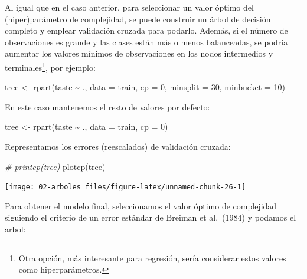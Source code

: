 \documentclass[
]{book}
\newenvironment{Shaded}{\begin{snugshade}}{\end{snugshade}}
\newcommand{\AttributeTok}[1]{\textcolor[rgb]{0.77,0.63,0.00}{#1}}
\newcommand{\CommentTok}[1]{\textcolor[rgb]{0.56,0.35,0.01}{\textit{#1}}}
\newcommand{\DecValTok}[1]{\textcolor[rgb]{0.00,0.00,0.81}{#1}}
\newcommand{\FunctionTok}[1]{\textcolor[rgb]{0.00,0.00,0.00}{#1}}
\newcommand{\NormalTok}[1]{#1}
\newcommand{\OtherTok}[1]{\textcolor[rgb]{0.56,0.35,0.01}{#1}}
\newcommand{\SpecialCharTok}[1]{\textcolor[rgb]{0.00,0.00,0.00}{#1}}
\theoremstyle{break}
\theoremstyle{definition}
\theoremstyle{definition}
\theoremstyle{definition}
\theoremstyle{definition}
\theoremstyle{remark}
\begin{document}
Al igual que en el caso anterior, para seleccionar un valor óptimo del (hiper)parámetro de complejidad, se puede construir un árbol de decisión completo y emplear validación cruzada para podarlo.
Además, si el número de observaciones es grande y las clases están más o menos balanceadas,
se podría aumentar los valores mínimos de observaciones en los nodos intermedios y terminales\footnote{Otra opción, más interesante para regresión, sería considerar estos valores como hiperparámetros.}, por ejemplo:

\begin{Shaded}
\begin{Highlighting}[]
\NormalTok{tree }\OtherTok{\textless{}{-}} \FunctionTok{rpart}\NormalTok{(taste }\SpecialCharTok{\textasciitilde{}}\NormalTok{ ., }\AttributeTok{data =}\NormalTok{ train, }\AttributeTok{cp =} \DecValTok{0}\NormalTok{, }\AttributeTok{minsplit =} \DecValTok{30}\NormalTok{, }\AttributeTok{minbucket =} \DecValTok{10}\NormalTok{)}
\end{Highlighting}
\end{Shaded}

En este caso mantenemos el resto de valores por defecto:

\begin{Shaded}
\begin{Highlighting}[]
\NormalTok{tree }\OtherTok{\textless{}{-}} \FunctionTok{rpart}\NormalTok{(taste }\SpecialCharTok{\textasciitilde{}}\NormalTok{ ., }\AttributeTok{data =}\NormalTok{ train, }\AttributeTok{cp =} \DecValTok{0}\NormalTok{)}
\end{Highlighting}
\end{Shaded}

Representamos los errores (reescalados) de validación cruzada:

\begin{Shaded}
\begin{Highlighting}[]
\CommentTok{\# printcp(tree)}
\FunctionTok{plotcp}\NormalTok{(tree)}
\end{Highlighting}
\end{Shaded}

\begin{center}\texttt{[image: 02-arboles\_files/figure-latex/unnamed-chunk-26-1]} \end{center}

Para obtener el modelo final, seleccionamos el valor óptimo de complejidad siguiendo el criterio de un error estándar de Breiman et al.~(1984) y podamos el arbol:
\end{document}
